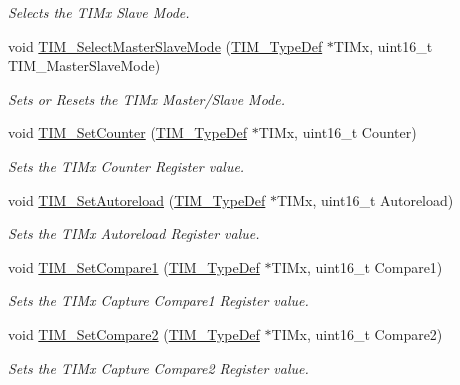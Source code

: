 \begin{DoxyCompactItemize}
\begin{DoxyCompactList}\small\item\em Selects the T\+I\+Mx Slave Mode. \end{DoxyCompactList}\item 
void \mbox{\hyperlink{group___t_i_m___exported___functions_ga4dcc3d11b670c381d0ff9cb7e9fd01e2}{T\+I\+M\+\_\+\+Select\+Master\+Slave\+Mode}} (\mbox{\hyperlink{struct_t_i_m___type_def}{T\+I\+M\+\_\+\+Type\+Def}} $\ast$T\+I\+Mx, uint16\+\_\+t T\+I\+M\+\_\+\+Master\+Slave\+Mode)
\begin{DoxyCompactList}\small\item\em Sets or Resets the T\+I\+Mx Master/\+Slave Mode. \end{DoxyCompactList}\item 
void \mbox{\hyperlink{group___t_i_m___exported___functions_gaad2c31dc9c551b48f08b96ba49c4aa44}{T\+I\+M\+\_\+\+Set\+Counter}} (\mbox{\hyperlink{struct_t_i_m___type_def}{T\+I\+M\+\_\+\+Type\+Def}} $\ast$T\+I\+Mx, uint16\+\_\+t Counter)
\begin{DoxyCompactList}\small\item\em Sets the T\+I\+Mx Counter Register value. \end{DoxyCompactList}\item 
void \mbox{\hyperlink{group___t_i_m___exported___functions_ga7880e4c00002d6421f9059a2ed841d5c}{T\+I\+M\+\_\+\+Set\+Autoreload}} (\mbox{\hyperlink{struct_t_i_m___type_def}{T\+I\+M\+\_\+\+Type\+Def}} $\ast$T\+I\+Mx, uint16\+\_\+t Autoreload)
\begin{DoxyCompactList}\small\item\em Sets the T\+I\+Mx Autoreload Register value. \end{DoxyCompactList}\item 
void \mbox{\hyperlink{group___t_i_m___exported___functions_gab3a6031f187cb8af62eb09a67b4fd2ad}{T\+I\+M\+\_\+\+Set\+Compare1}} (\mbox{\hyperlink{struct_t_i_m___type_def}{T\+I\+M\+\_\+\+Type\+Def}} $\ast$T\+I\+Mx, uint16\+\_\+t Compare1)
\begin{DoxyCompactList}\small\item\em Sets the T\+I\+Mx Capture Compare1 Register value. \end{DoxyCompactList}\item 
void \mbox{\hyperlink{group___t_i_m___exported___functions_ga0175ef4fabade443909002a63d4e9758}{T\+I\+M\+\_\+\+Set\+Compare2}} (\mbox{\hyperlink{struct_t_i_m___type_def}{T\+I\+M\+\_\+\+Type\+Def}} $\ast$T\+I\+Mx, uint16\+\_\+t Compare2)
\begin{DoxyCompactList}\small\item\em Sets the T\+I\+Mx Capture Compare2 Register value. \end{DoxyCompactList}\item 

\end{DoxyCompactItemize}
